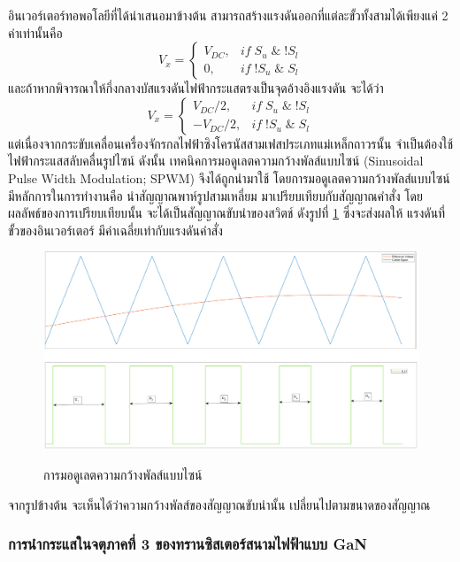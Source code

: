 \documentclass[11pt,a4paper]{article}
\begin{document}
อินเวอร์เตอร์ทอพอโลยีที่ได้นำเสนอมาข้างต้น สามารถสร้างแรงดันออกที่แต่ละขั้วทั้งสามได้เพียงแค่ 2 ค่าเท่านั้นคือ
\begin{equation*}
    V_x = \begin{cases}
        V_{DC}, & if \; S_u \;\& \;!S_l  \\
        0,      & if \; ! S_u\; \&\; S_l
    \end{cases}
\end{equation*}
และถ้าหากพิจารณาให้กึ่งกลางบัสแรงดันไฟฟ้ากระแสตรงเป็นจุดอ้างอิงแรงดัน จะได้ว่า
\begin{equation*}
    V_x = \begin{cases}
        V_{DC}/2,  & if \; S_u \;\& \;!S_l  \\
        -V_{DC}/2, & if \; ! S_u \;\& \;S_l
    \end{cases}
\end{equation*}
แต่เนื่องจากกระขับเคลื่อนเครื่องจักรกลไฟฟ้าซิงโครนัสสามเฟสประเภทแม่เหล็กถาวรนั้น จำเป็นต้องใช้ไฟฟ้ากระแสสลับคลื่นรูปไซน์ ดังนั้น เทคนิคการมอดูเลตความกว้างพัลส์แบบไซน์ (Sinusoidal Pulse Width Modulation; SPWM) จึงได้ถูกนำมาใช้ โดยการมอดูเลตความกว้างพัลส์แบบไซน์มีหลักการในการทำงานคือ นำสัญญาณพาห์รูปสามเหลี่ยม มาเปรียบเทียบกับสัญญาณคำสั่ง โดยผลลัพธ์ของการเปรียบเทียบนั้น จะได้เป็นสัญญาณขับนำของสวิตช์ ดังรูปที่ \ref*{spwmgraph} ซึ่งจะส่งผลให้ แรงดันที่ขั้วของอินเวอร์เตอร์ มีค่าเฉลี่ยเท่ากับแรงดันคำสั่ง 
\begin{figure}[!h]
    \includegraphics[width=\textwidth]{spwm}
    \label{spwmgraph}
    \caption{การมอดูเลตความกว้างพัลส์แบบไซน์}
\end{figure}
จากรูปข้างต้น จะเห็นได้ว่าความกว้างพัลส์ของสัญญาณขับนำนั้น เปลี่ยนไปตามขนาดของสัญญาณ
\subsubsection{การนำกระแสในจตุภาคที่ 3 ของทรานซิสเตอร์สนามไฟฟ้าแบบ GaN}
\end{document}

